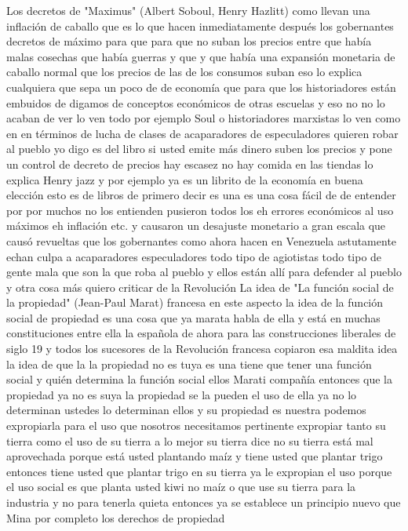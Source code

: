 Los decretos de "Maximus" (Albert Soboul, Henry Hazlitt)
como llevan una inflación de caballo que es lo que hacen inmediatamente después los gobernantes decretos de máximo para que para que no suban los precios
entre que había malas cosechas que había guerras y que y que había una expansión monetaria de caballo normal que los precios de las de los consumos suban
eso lo explica cualquiera que sepa un poco de de economía que para que los historiadores están embuidos de digamos de conceptos económicos de otras escuelas
y eso no no lo acaban de ver lo ven todo por ejemplo Soul o historiadores marxistas lo ven como en en términos de lucha de clases
de acaparadores de especuladores quieren robar al pueblo yo digo es del libro si usted emite más dinero
suben los precios y pone un control de decreto de precios hay escasez no hay comida en las tiendas lo explica Henry jazz
y por ejemplo ya es un librito de la economía en buena elección esto es de libros de primero decir es una
es una cosa fácil de de entender por por muchos no los entienden pusieron todos los eh errores económicos
al uso máximos eh inflación etc. y causaron un desajuste monetario a gran escala
que causó revueltas que los gobernantes como ahora hacen en Venezuela
astutamente echan culpa a acaparadores especuladores todo tipo de agiotistas todo tipo de gente mala
que son la que roba al pueblo y ellos están allí para defender al pueblo y otra cosa más quiero criticar de la Revolución
La idea de "La función social de la propiedad" (Jean-Paul Marat)
francesa en este aspecto la idea de la función social de propiedad
es una cosa que ya marata habla de ella y está en muchas constituciones entre ella la española de ahora para las construcciones liberales de siglo 19
y todos los sucesores de la Revolución francesa copiaron esa maldita idea la idea de que la la propiedad no es tuya
es una tiene que tener una función social y quién determina la función social ellos Marati compañía
entonces que la propiedad ya no es suya la propiedad se la pueden el uso de ella ya no lo determinan ustedes
lo determinan ellos y su propiedad es nuestra podemos expropiarla para el uso que nosotros necesitamos pertinente
expropiar tanto su tierra como el uso de su tierra a lo mejor su tierra dice no su tierra está mal aprovechada porque está usted plantando maíz
y tiene usted que plantar trigo entonces tiene usted que plantar trigo en su tierra ya le expropian el uso porque el uso social es que planta usted kiwi no maíz
o que use su tierra para la industria y no para tenerla quieta entonces ya se establece un principio nuevo que Mina por completo los derechos de propiedad
